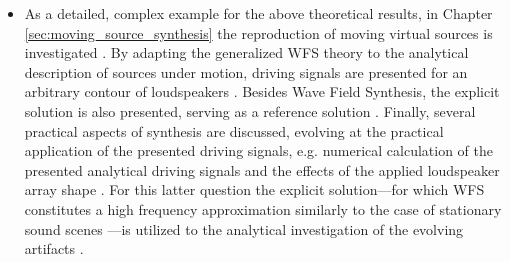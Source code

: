 \begin{itemize}
%
\item As a detailed, complex example for the above theoretical results, in Chapter \ref{sec:moving_source_synthesis} the reproduction of moving virtual sources is investigated \cite{Firtha2019:daga}.
By adapting the generalized WFS theory to the analytical description of sources under motion, driving signals are presented for an arbitrary contour of loudspeakers \cite{Firtha2015:daga, firtha2016wave, doi:10.1121/1.4996126}.
Besides Wave Field Synthesis, the explicit solution is also presented, serving as a reference solution \cite{Firtha2014:daga, Firtha2014:isma}.
Finally, several practical aspects of synthesis are discussed, evolving at the practical application of the presented driving signals, e.g. numerical calculation of the presented analytical driving signals and the effects of the applied loudspeaker array shape \cite{Firtha2018_daga_moving_source}.
For this latter question the explicit solution---for which WFS constitutes a high frequency approximation similarly to the case of stationary sound scenes \cite{firtha2015sound}---is utilized to the analytical investigation of the evolving artifacts \cite{firtha2016:daga}.
\end{itemize}